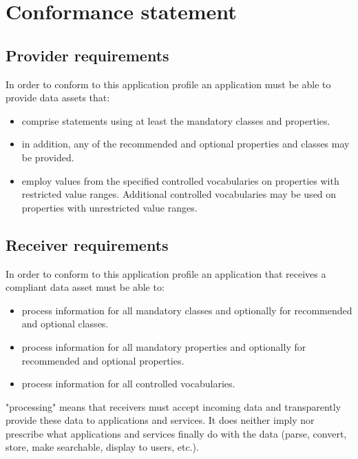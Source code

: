 \section{Conformance statement}
\label{ariaid-title13}


\subsection{Provider requirements}
\label{provider-requirements}

In order to conform to this application profile an application must be
able to provide data assets that:

\begin{itemize}
\item
  comprise statements using at least the mandatory classes and
  properties.
\item
  in addition, any of the recommended and optional properties and
  classes may be provided.
\item
  employ values from the specified controlled vocabularies on properties
  with restricted value ranges. Additional controlled vocabularies may
  be used on properties with unrestricted value ranges.
\end{itemize}

\subsection{Receiver requirements}
\label{receiver-requirements}

In order to conform to this application profile an application that
receives a compliant data asset must be able to:

\begin{itemize}
\item
  process information for all mandatory classes and optionally for
  recommended and optional classes.
\item
  process information for all mandatory properties and optionally for
  recommended and optional properties.
\item
  process information for all controlled vocabularies.
\end{itemize}

"processing" means that receivers must accept incoming data and
transparently provide these data to applications and services. It does
neither imply nor prescribe what applications and services finally do
with the data (parse, convert, store, make searchable, display to users,
etc.).
